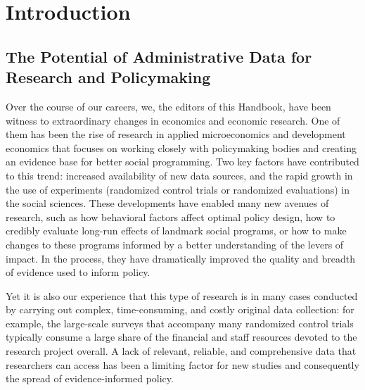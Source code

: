 \hypertarget{intro}{%
\chapter{Introduction}\label{intro}}

\hrulefill

\hypertarget{the-potential-of-administrative-data-for-research-and-policymaking}{%
\section{The Potential of Administrative Data for Research and Policymaking}\label{the-potential-of-administrative-data-for-research-and-policymaking}}

Over the course of our careers, we, the editors of this Handbook, have been witness to extraordinary changes in economics and economic research. One of them has been the rise of research in applied microeconomics and development economics that focuses on working closely with policymaking bodies and creating an evidence base for better social programming. Two key factors have contributed to this trend: increased availability of new data sources, and the rapid growth in the use of experiments (randomized control trials or randomized evaluations) in the social sciences. These developments have enabled many new avenues of research, such as how behavioral factors affect optimal policy design, how to credibly evaluate long-run effects of landmark social programs, or how to make changes to these programs informed by a better understanding of the levers of impact. In the process, they have dramatically improved the quality and breadth of evidence used to inform policy.

Yet it is also our experience that this type of research is in many cases conducted by carrying out complex, time-consuming, and costly original data collection: for example, the large-scale surveys that accompany many randomized control trials typically consume a large share of the financial and staff resources devoted to the research project overall. A lack of relevant, reliable, and comprehensive data that researchers can access has been a limiting factor for new studies and consequently the spread of evidence-informed policy.

